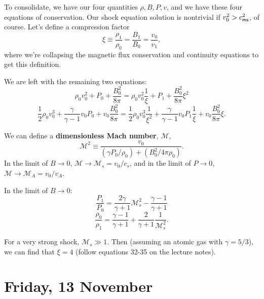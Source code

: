 \documentclass{tufte-handout}
\renewcommand{\textbf}[1]{{\bf \textcolor{dark-gray}{#1}}}
\renewcommand{\rm}{\sf}
\begin{document}
To consolidate, we have our four quantities $\rho, B, P, v$, and we have these four equations of conservation. Our shock equation solution is nontrivial if $v_0^2 > c_{\rm ms}^2$, of course. Let's define a compression factor
\begin{equation}
\xi \equiv \frac{\rho_1}{\rho_0} = \frac{B_1}{B_0} = \frac{v_0}{v_1},
\end{equation}
where we're collapsing the magnetic flux conservation and continuity equations to get this definition.

We are left with the remaining two equations:
\[\rho_0 v_0^2 + P_0 + \frac{B_0^2}{8\pi} = \rho_0 v_0^2 \frac{1}{\xi} + P_1 + \frac{B_0^2}{8\pi}\xi^2\]
\[\frac{1}{2}\rho_0v_0^3 + \frac{\gamma}{\gamma-1} v_0 P_0 + v_0\frac{B_0^2}{8\pi} = \frac{1}{2}\rho_0v_0^3 \frac{1}{\xi^2} + \frac{\gamma}{\gamma-1} v_0 P_1 \frac{1}{\xi} + v_0 \frac{B_0^2}{8\pi}\xi.\]

We can define a \textbf{dimensionless Mach number}, $\mathcal M$,
\begin{equation}
\mathcal M^2 \equiv \frac{v_0}{(\gamma P_0/\rho_0) + (B_0^2/4\pi \rho_0)}.
\end{equation}
In the limit of $B\rightarrow 0 $, $\mathcal M \rightarrow \mathcal M_s = v_0/c_s$, and in the limit of $P\rightarrow 0$, $\mathcal M \rightarrow \mathcal M_A = v_0 / v_A$. 

In the limit of $B \rightarrow 0$:
\[\frac{P_1}{P_0} = \frac{2\gamma}{\gamma+1} \mathcal M_s^2 - \frac{\gamma - 1}{\gamma + 1}\]
\[ \frac{\rho_0}{\rho_1} = \frac{\gamma-1}{\gamma+1} + \frac{2}{\gamma+1} \frac{1}{\mathcal M_s^2}.\]

For a very strong shock, $\mathcal M_s \gg 1$. Then (assuming an atomic gas with $\gamma = 5/3$), we can find that $\xi = 4$ (follow equations 32-35 on the lecture notes).


\section{Friday, 13 November}
\end{document}
